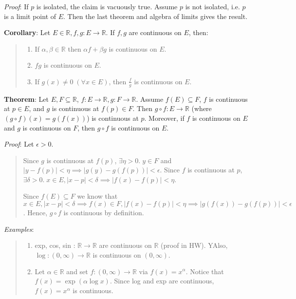 \documentclass[11pt]{article}
\begin{document}
\emph{Proof}: If $p$ is isolated, the claim is vacuously true. Assume $p$ is not isolated, i.e. $p$ is a limit point of $E$. Then the last theorem and algebra of limits gives the result.

\textbf{Corollary}: Let $E \in \mathbb{R}, f, g : E \to \mathbb{R}$. If $f,g$ are continuous on $E$, then:
\begin{quote}\vspace{-0.3cm}
	\begin{enumerate}
	\item If $\alpha, \beta \in \mathbb{R}$ then $\alpha f + \beta g$ is continuous on $E$.
	\item $fg$ is continuous on $E$.
	\item If $g(x) \neq 0\; (\forall x \in E)$, then $\frac{f}{g}$ is continuous on $E$.
	\end{enumerate}
\end{quote}

\textbf{Theorem}: Let $E, F \subseteq \mathbb{R}$, $f : E \to \mathbb{R}, g : F \to \mathbb{R}$. Assume $f(E) \subseteq F$, $f$ is continuous at $p \in E$, and $g$ is continuous at $f(p) \in F$. Then $g \circ f : E \to \mathbb{R}$ (where $(g \circ f)(x) = g(f(x))$) is continuous at $p$. Moreover, if $f$ is continuous on $E$ and $g$ is continuous on $F$, then $g \circ f$ is continuous on $E$.

\emph{Proof}: Let $\epsilon > 0$.
\begin{quote}\vspace{-0.3cm}
Since $g$ is continuous at $f(p)$, $\exists \eta > 0.\; y \in F$ and $|y - f(p)| < \eta \implies |g(y) - g(f(p))| < \epsilon$. Since $f$ is continuous at $p$, $\exists \delta > 0.\; x \in E, |x-p| < \delta \implies |f(x) - f(p)| < \eta$.

Since $f(E) \subseteq F$ we know that $x \in E, |x-p| < \delta \implies f(x) \in F, |f(x) - f(p)| < \eta \implies |g(f(x)) - g(f(p))| < \epsilon$. Hence, $g \circ f$ is continuous by definition.
\end{quote}

\emph{Examples}:
\begin{quote}\vspace{-0.3cm}
	\begin{enumerate}
	\item exp, cos, sin : $\mathbb{R} \to \mathbb{R}$ are continuous on $\mathbb{R}$ (proof in HW). YAlso, $\log : (0, \infty) \to \mathbb{R}$ is continuous on $(0, \infty)$.
	\item Let $\alpha \in \mathbb{R}$ and set $f : (0, \infty) \to \mathbb{R}$ via $f(x) = x^\alpha$. Notice that $f(x) = \exp ( \alpha \log x)$. Since log and exp are continuous, $f(x) = x^\alpha$ is continuous.
	\end{enumerate}
\end{quote}
\end{document}
